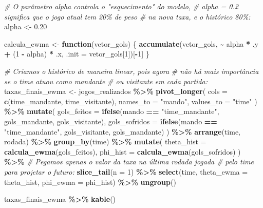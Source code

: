 \documentclass[11pt,]{article}
\newenvironment{Shaded}{\begin{snugshade}}{\end{snugshade}}
\newcommand{\AttributeTok}[1]{\textcolor[rgb]{0.13,0.29,0.53}{#1}}
\newcommand{\CommentTok}[1]{\textcolor[rgb]{0.56,0.35,0.01}{\textit{#1}}}
\newcommand{\ControlFlowTok}[1]{\textcolor[rgb]{0.13,0.29,0.53}{\textbf{#1}}}
\newcommand{\DecValTok}[1]{\textcolor[rgb]{0.00,0.00,0.81}{#1}}
\newcommand{\FloatTok}[1]{\textcolor[rgb]{0.00,0.00,0.81}{#1}}
\newcommand{\FunctionTok}[1]{\textcolor[rgb]{0.13,0.29,0.53}{\textbf{#1}}}
\newcommand{\NormalTok}[1]{#1}
\newcommand{\OtherTok}[1]{\textcolor[rgb]{0.56,0.35,0.01}{#1}}
\newcommand{\SpecialCharTok}[1]{\textcolor[rgb]{0.81,0.36,0.00}{\textbf{#1}}}
\newcommand{\StringTok}[1]{\textcolor[rgb]{0.31,0.60,0.02}{#1}}
\begin{document}
\begin{Shaded}
\begin{Highlighting}[]
\CommentTok{\# O parâmetro alpha controla o "esquecimento" do modelo,}
\CommentTok{\# alpha = 0.2 significa que o jogo atual tem 20\% de peso}
\CommentTok{\# na nova taxa, e o histórico 80\%:}
\NormalTok{alpha }\OtherTok{\textless{}{-}} \FloatTok{0.20}

\NormalTok{calcula\_ewma }\OtherTok{\textless{}{-}} \ControlFlowTok{function}\NormalTok{(vetor\_gols) \{}
    \FunctionTok{accumulate}\NormalTok{(vetor\_gols, }\SpecialCharTok{\textasciitilde{}}\NormalTok{ alpha }\SpecialCharTok{*}\NormalTok{ .y }\SpecialCharTok{+}\NormalTok{ (}\DecValTok{1} \SpecialCharTok{{-}}\NormalTok{ alpha) }\SpecialCharTok{*}\NormalTok{ .x,}
               \AttributeTok{.init =}\NormalTok{ vetor\_gols[}\DecValTok{1}\NormalTok{])[}\SpecialCharTok{{-}}\DecValTok{1}\NormalTok{]}
\NormalTok{\}}

\CommentTok{\# Criamos o histórico de maneira linear, pois agora}
\CommentTok{\# não há mais importância se o time atuou como mandante}
\CommentTok{\# ou visitante em cada partida:}
\NormalTok{taxas\_finais\_ewma }\OtherTok{\textless{}{-}}\NormalTok{ jogos\_realizados }\SpecialCharTok{\%\textgreater{}\%}
    \FunctionTok{pivot\_longer}\NormalTok{(}
        \AttributeTok{cols =} \FunctionTok{c}\NormalTok{(time\_mandante, time\_visitante),}
        \AttributeTok{names\_to =} \StringTok{"mando"}\NormalTok{,}
        \AttributeTok{values\_to =} \StringTok{"time"}
\NormalTok{    ) }\SpecialCharTok{\%\textgreater{}\%}
    \FunctionTok{mutate}\NormalTok{(}
        \AttributeTok{gols\_feitos =} \FunctionTok{ifelse}\NormalTok{(mando }\SpecialCharTok{==} \StringTok{"time\_mandante"}\NormalTok{,}
\NormalTok{                             gols\_mandante, gols\_visitante),}
        \AttributeTok{gols\_sofridos =} \FunctionTok{ifelse}\NormalTok{(mando }\SpecialCharTok{==} \StringTok{"time\_mandante"}\NormalTok{,}
\NormalTok{                               gols\_visitante, gols\_mandante)}
\NormalTok{    ) }\SpecialCharTok{\%\textgreater{}\%}
    \FunctionTok{arrange}\NormalTok{(time, rodada) }\SpecialCharTok{\%\textgreater{}\%}
    \FunctionTok{group\_by}\NormalTok{(time) }\SpecialCharTok{\%\textgreater{}\%}
    \FunctionTok{mutate}\NormalTok{(}
        \AttributeTok{theta\_hist =} \FunctionTok{calcula\_ewma}\NormalTok{(gols\_feitos),}
        \AttributeTok{phi\_hist =} \FunctionTok{calcula\_ewma}\NormalTok{(gols\_sofridos)}
\NormalTok{    ) }\SpecialCharTok{\%\textgreater{}\%}
    \CommentTok{\# Pegamos apenas o valor da taxa na última rodada jogada}
    \CommentTok{\# pelo time para projetar o futuro:}
    \FunctionTok{slice\_tail}\NormalTok{(}\AttributeTok{n =} \DecValTok{1}\NormalTok{) }\SpecialCharTok{\%\textgreater{}\%}
    \FunctionTok{select}\NormalTok{(time, }\AttributeTok{theta\_ewma =}\NormalTok{ theta\_hist, }\AttributeTok{phi\_ewma =}\NormalTok{ phi\_hist) }\SpecialCharTok{\%\textgreater{}\%}
    \FunctionTok{ungroup}\NormalTok{()}

\NormalTok{taxas\_finais\_ewma }\SpecialCharTok{\%\textgreater{}\%}
    \FunctionTok{kable}\NormalTok{()}
\end{Highlighting}
\end{Shaded}
\end{document}
